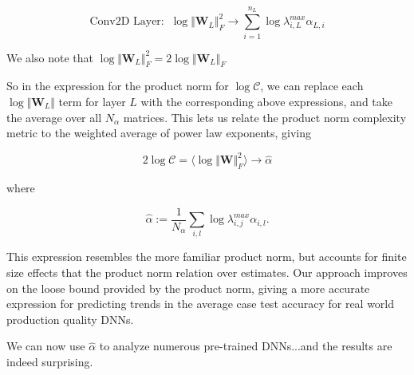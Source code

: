 $$\text{Conv2D Layer:}\;\;\log\Vert\mathbf{W}_{L}\Vert^{2}_{F}\rightarrow \sum_{i=1}^{n_{L}}\log\lambda^{max}_{i,L}\alpha_{L,i}$$

We also note that $\log\Vert\mathbf{W}_{L}\Vert^{2}_{F}=2\log\Vert\mathbf{W}_{L}\Vert_{F}$ 

So in the expression for the product norm for $\log\mathcal{C}$, we can replace each $\log\Vert\mathbf{W}_{L}\Vert$ term for layer $L$ with the corresponding above expressions, and take the average over all $N_{\alpha}$  matrices.  This lets us relate the product norm complexity metric to the weighted average of power law exponents, giving

$$2\log\mathcal{C}=\langle\log\Vert\mathbf{W}\Vert^{2}_{F}\rangle\rightarrow\hat{\alpha}$$ 

where

\begin{equation}
\hat{\alpha}:=\dfrac{1}{N_{\alpha}}\sum_{i,l}\log\lambda^{max}_{i,j}\alpha_{i,l}  .
\label{eqn:alpha_hat_specific}
\end{equation}

This expression resembles the more familiar product norm, but accounts for finite size effects that the product norm relation over estimates.
Our approach improves on the loose bound provided by the product norm, giving a more accurate expression for predicting trends
in the average case test accuracy for real world production quality DNNs.

We can now use $\hat{\alpha}$ to analyze numerous pre-trained DNNs...and the results are indeed surprising.


